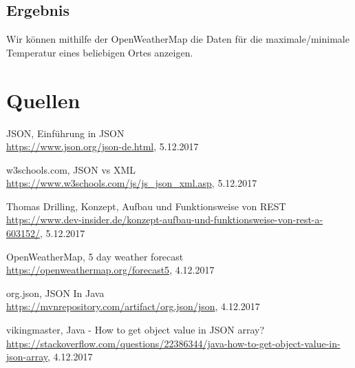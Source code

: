 \subsection{Ergebnis}

Wir können mithilfe der OpenWeatherMap die Daten für die maximale/minimale Temperatur eines beliebigen Ortes anzeigen.

\section{Quellen}
\begin{thebibliography}{999}

 JSON, Einführung in JSON \\
\url{https://www.json.org/json-de.html}, 5.12.2017

 w3schools.com, JSON vs XML \\
\url{https://www.w3schools.com/js/js_json_xml.asp}, 5.12.2017

 Thomas Drilling, Konzept, Aufbau und Funktionsweise von REST \\
\url{https://www.dev-insider.de/konzept-aufbau-und-funktionsweise-von-rest-a-603152/}, 5.12.2017

 OpenWeatherMap, 5 day weather forecast \\ \url{https://openweathermap.org/forecast5}, 4.12.2017

 org.json, JSON In Java \\ \url{https://mvnrepository.com/artifact/org.json/json}, 4.12.2017

 vikingmaster, Java - How to get object value in JSON array? \\ \url{https://stackoverflow.com/questions/22386344/java-how-to-get-object-value-in-json-array}, 4.12.2017

\end{thebibliography}







